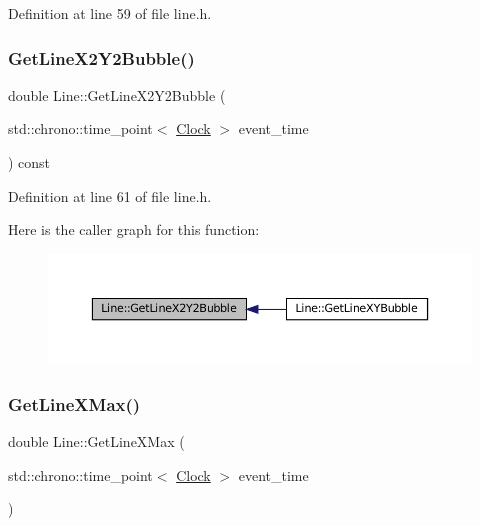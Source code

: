 Definition at line 59 of file line.\+h.

\mbox{\label{class_line_a2432406f734963e4497541081a843131}} 
\subsubsection{\texorpdfstring{Get\+Line\+X2\+Y2\+Bubble()}{GetLineX2Y2Bubble()}}
{\footnotesize\ttfamily double Line\+::\+Get\+Line\+X2\+Y2\+Bubble (\begin{DoxyParamCaption}\item[{std\+::chrono\+::time\+\_\+point$<$ \mbox{\hyperlink{universe_8h_a0ef8d951d1ca5ab3cfaf7ab4c7a6fd80}{Clock}} $>$}]{event\+\_\+time }\end{DoxyParamCaption}) const\hspace{0.3cm}{\ttfamily [inline]}}



Definition at line 61 of file line.\+h.

Here is the caller graph for this function\+:\nopagebreak
\begin{figure}[H]
\begin{center}
\leavevmode
\includegraphics[width=350pt]{class_line_a2432406f734963e4497541081a843131_icgraph}
\end{center}
\end{figure}
\mbox{\label{class_line_a1393a4dcd9fa9e1ab1653c37d76c8c3a}} 
\subsubsection{\texorpdfstring{Get\+Line\+X\+Max()}{GetLineXMax()}}
{\footnotesize\ttfamily double Line\+::\+Get\+Line\+X\+Max (\begin{DoxyParamCaption}\item[{std\+::chrono\+::time\+\_\+point$<$ \mbox{\hyperlink{universe_8h_a0ef8d951d1ca5ab3cfaf7ab4c7a6fd80}{Clock}} $>$}]{event\+\_\+time }\end{DoxyParamCaption})\hspace{0.3cm}{\ttfamily [inline]}}



